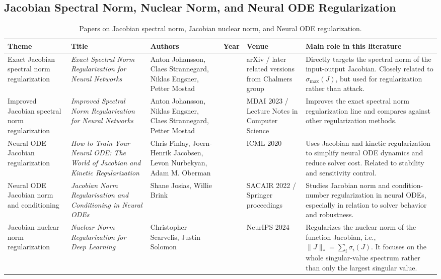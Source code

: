 \documentclass{article}
\begin{document}
\subsection{Jacobian Spectral Norm, Nuclear Norm, and Neural ODE Regularization}

\begin{landscape}
\begin{table}[p]
\centering
\footnotesize
\begin{tabular}{>{\raggedright\arraybackslash}p{2.4cm} >{\raggedright\arraybackslash}p{4.0cm} >{\raggedright\arraybackslash}p{3.4cm} >{\raggedright\arraybackslash}p{1.0cm} >{\raggedright\arraybackslash}p{3.2cm} >{\raggedright\arraybackslash}p{6.2cm}}
\hline
\textbf{Theme} & \textbf{Title} & \textbf{Authors} & \textbf{Year} & \textbf{Venue} & \textbf{Main role in this literature} \\
\hline
Exact Jacobian spectral norm regularization &
\textit{Exact Spectral Norm Regularization for Neural Networks} &
Anton Johansson, Claes Strannegard, Niklas Engsner, Petter Mostad &
2022 &
arXiv / later related versions from Chalmers group &
Directly targets the spectral norm of the input-output Jacobian. Closely related to \(\sigma_{\max}(J)\), but used for regularization rather than attack. \\
\hline
Improved Jacobian spectral norm regularization &
\textit{Improved Spectral Norm Regularization for Neural Networks} &
Anton Johansson, Niklas Engsner, Claes Strannegard, Petter Mostad &
2023 &
MDAI 2023 / Lecture Notes in Computer Science &
Improves the exact spectral norm regularization line and compares against other regularization methods. \\
\hline
Neural ODE Jacobian regularization &
\textit{How to Train Your Neural ODE: The World of Jacobian and Kinetic Regularization} &
Chris Finlay, Joern-Henrik Jacobsen, Levon Nurbekyan, Adam M. Oberman &
2020 &
ICML 2020 &
Uses Jacobian and kinetic regularization to simplify neural ODE dynamics and reduce solver cost. Related to stability and sensitivity control. \\
\hline
Neural ODE Jacobian norm and conditioning &
\textit{Jacobian Norm Regularisation and Conditioning in Neural ODEs} &
Shane Josias, Willie Brink &
2022 &
SACAIR 2022 / Springer proceedings &
Studies Jacobian norm and condition-number regularization in neural ODEs, especially in relation to solver behavior and robustness. \\
\hline
Jacobian nuclear norm regularization &
\textit{Nuclear Norm Regularization for Deep Learning} &
Christopher Scarvelis, Justin Solomon &
2024 &
NeurIPS 2024 &
Regularizes the nuclear norm of the function Jacobian, i.e.,
\(\|J\|_*=\sum_i \sigma_i(J)\). It focuses on the whole singular-value spectrum rather than only the largest singular value. \\
\hline
\end{tabular}
\caption{Papers on Jacobian spectral norm, Jacobian nuclear norm, and Neural ODE regularization.}
\end{table}
\end{landscape}
\end{document}
